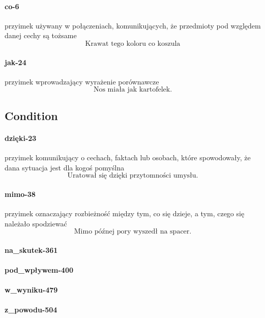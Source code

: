 \documentclass[a4paper, 12pt]{article}
\theoremstyle{remark}
\begin{document}
\paragraph{co-6} \label{prep-6}	przyimek używany w połączeniach, komunikujących, że przedmioty pod względem danej cechy są tożsame
\begin{equation}
\text{Krawat tego koloru co koszula}
\end{equation}
\paragraph{jak-24} \label{prep-24}	przyimek wprowadzający wyrażenie porównawcze
\begin{equation}
\text{Nos miała jak kartofelek.}
\end{equation}
\subsection{Condition} %
\label{sub:condition}
\paragraph{dzięki-23} \label{prep-23}	przyimek komunikujący o cechach, faktach lub osobach, które spowodowały, że dana sytuacja jest dla kogoś pomyślna
\begin{equation}
\text{Uratował się dzięki przytomności umysłu.}
\end{equation}
\paragraph{mimo-38} \label{prep-38}	przyimek oznaczający rozbieżność między tym, co się dzieje, a tym, czego się należało spodziewać
\begin{equation}
\text{Mimo późnej pory wyszedł na spacer.}
\end{equation}
\paragraph{na\_skutek-361} \label{prep-361}
\paragraph{pod\_wpływem-400} \label{prep-400}
\paragraph{w\_wyniku-479} \label{prep-479}
\paragraph{z\_powodu-504} \label{prep-504}
\end{document}
